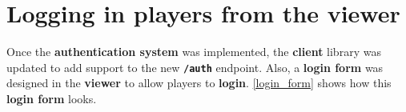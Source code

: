\documentclass[a4paper,11pt,titlepage,abstract,numbers=noenddot,automark,mnsy,intlimits,rgb,dvipsnames]{report}
\begin{document}
\section{Logging in players from the viewer}
Once the \textbf{authentication system} was implemented, the \textbf{client} library was updated to add support to the new \textbf{\texttt{/auth}}
endpoint. Also, a \textbf{login form} was designed in the \textbf{viewer} to allow players to \textbf{login}. \autoref{login_form}
shows how this \textbf{login form} looks.
\begin{figure}[H]
\end{figure}
\end{document}
